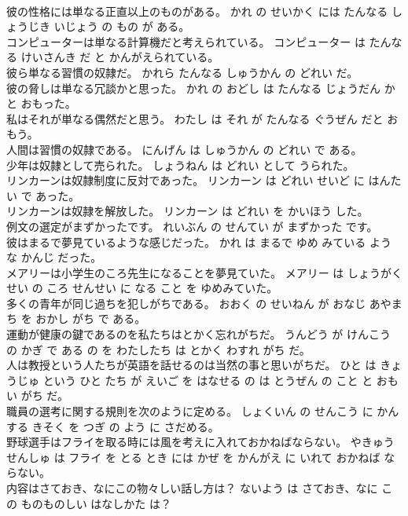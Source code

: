 \documentclass[8pt]{extreport}
\begin{document}
\begin{CJK}{UTF8}{min}
\\	彼の性格には単なる正直以上のものがある。	かれ の せいかく には たんなる しょうじき いじょう の もの が ある。	
\\	コンピューターは単なる計算機だと考えられている。	コンピューター は たんなる けいさんき だ と かんがえられている。	
\\	彼ら単なる習慣の奴隷だ。	かれら たんなる しゅうかん の どれい だ。	
\\	彼の脅しは単なる冗談かと思った。	かれ の おどし は たんなる じょうだん かと おもった。	
\\	私はそれが単なる偶然だと思う。	わたし は それ が たんなる ぐうぜん だと おもう。	
\\	人間は習慣の奴隷である。	にんげん は しゅうかん の どれい で ある。	
\\	少年は奴隷として売られた。	しょうねん は どれい として うられた。	
\\	リンカーンは奴隷制度に反対であった。	リンカーン は どれい せいど に はんたい で あった。	
\\	リンカーンは奴隷を解放した。	リンカーン は どれい を かいほう した。	
\\	例文の選定がまずかったです。	れいぶん の せんてい が まずかった です。	
\\	彼はまるで夢見ているような感じだった。	かれ は まるで ゆめ みている よう な かんじ だった。	
\\	メアリーは小学生のころ先生になることを夢見ていた。	メアリー は しょうがくせい の ころ せんせい に なる こと を ゆめみていた。	
\\	多くの青年が同じ過ちを犯しがちである。	おおく の せいねん が おなじ あやまち を おかし がち で ある。	
\\	運動が健康の鍵であるのを私たちはとかく忘れがちだ。	うんどう が けんこう の かぎ で ある の を わたしたち は とかく わすれ がち だ。	
\\	人は教授という人たちが英語を話せるのは当然の事と思いがちだ。	ひと は きょうじゅ という ひと たち が えいご を はなせる の は とうぜん の こと と おもい がち だ。	
\\	職員の選考に関する規則を次のように定める。	しょくいん の せんこう に かんする きそく を つぎ の よう に さだめる。	
\\	野球選手はフライを取る時には風を考えに入れておかねばならない。	やきゅう せんしゅ は フライ を とる とき には かぜ を かんがえ に いれて おかねば ならない。	
\\	内容はさておき、なにこの物々しい話し方は？	ないよう は さておき、なに この ものものしい はなしかた は？	

\end{CJK}
\end{document}
